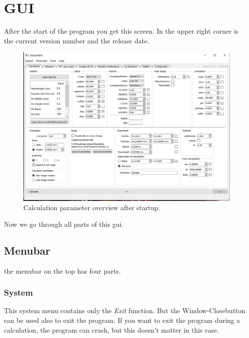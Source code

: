 \documentclass[11pt]{article} %
\begin{document}
\clearpage
\section{GUI}

After the start of the program you get this screen. In the upper right corner is the current version number and the release date.

\begin{figure}[H]
 \centering
 \includegraphics[width=\textwidth]{gui-calculations.png}
 \caption{Calculation parameter overview after startup.}
\end{figure}
Now we go through all parts of this gui.


\subsection{Menubar}

the menubar on the top has four parts.

\subsubsection{System}

This system menu contains only the {\it Exit} function. But the Window-Closebutton can be used also to exit the program. If you want to exit the program during a calculation, the program can crash, but this doesn't matter in this case.
\end{document}
